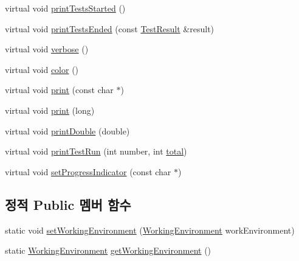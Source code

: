 \begin{DoxyCompactItemize}
\item 
virtual void \hyperlink{class_test_output_a1c2b129bfdc2b392ffa618864707dd89}{print\+Tests\+Started} ()
\item 
virtual void \hyperlink{class_test_output_acc5ba82a215510b66f5f294258686dd4}{print\+Tests\+Ended} (const \hyperlink{class_test_result}{Test\+Result} \&result)
\item 
virtual void \hyperlink{class_test_output_a2ae0a8d48809abb33b5ba47c56fdc3ad}{verbose} ()
\item 
virtual void \hyperlink{class_test_output_ae8d23f2d3de1d9d47d8139d54fb89640}{color} ()
\item 
virtual void \hyperlink{class_test_output_a321b5c489a90374cb61c34fe5d2253ef}{print} (const char $\ast$)
\item 
virtual void \hyperlink{class_test_output_afdf7e5004a8aead20ea3b1ddec76fa73}{print} (long)
\item 
virtual void \hyperlink{class_test_output_a0ed13c187762336a2bf0fd89687b014a}{print\+Double} (double)
\item 
virtual void \hyperlink{class_test_output_a0cffc4628d21b0cd25649f9084927ca9}{print\+Test\+Run} (int number, int \hyperlink{test__intervals_8c_ac7af894858cf396a219d632f40afdc8d}{total})
\item 
virtual void \hyperlink{class_test_output_a97c09fc275d40b7ec559aaa91843cdcd}{set\+Progress\+Indicator} (const char $\ast$)
\end{DoxyCompactItemize}
\subsection*{정적 Public 멤버 함수}
\begin{DoxyCompactItemize}
\item 
static void \hyperlink{class_test_output_a25907ddd60d8454ca78f81edef6c77c3}{set\+Working\+Environment} (\hyperlink{class_test_output_a0541851f863713454486a9fb3080f766}{Working\+Environment} work\+Environment)
\item 
static \hyperlink{class_test_output_a0541851f863713454486a9fb3080f766}{Working\+Environment} \hyperlink{class_test_output_a90d5028d0f7f6f41ca2dced042a8709d}{get\+Working\+Environment} ()
\end{DoxyCompactItemize}
